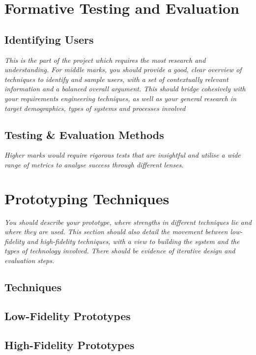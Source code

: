 \documentclass{article}
\begin{document}
\section{Formative Testing and Evaluation}
\subsection{Identifying Users}
\textit{This is the part of the project which requires the most research and understanding. For middle marks, you should provide a good, clear overview of techniques to identify and sample users, with a set of contextually relevant information and a balanced overall argument. This should bridge cohesively with your requirements engineering techniques, as well as your general research in target demographics, types of systems and processes involved}
\subsection{Testing \& Evaluation Methods}
\textit{Higher marks would require rigorous tests that are insightful and utilise a wide range of metrics to analyse success through different lenses.}


\subsection{}

\section{Prototyping Techniques}
\textit{You should describe your prototype, where strengths in different techniques lie and where they are used. This section should also detail the movement between low- fidelity and high-fidelity techniques, with a view to building the system and the types of technology involved. There should be evidence of iterative design and evaluation steps.}
\subsection{Techniques}
\subsection{Low-Fidelity Prototypes}
\subsection{High-Fidelity Prototypes}
\end{document}
